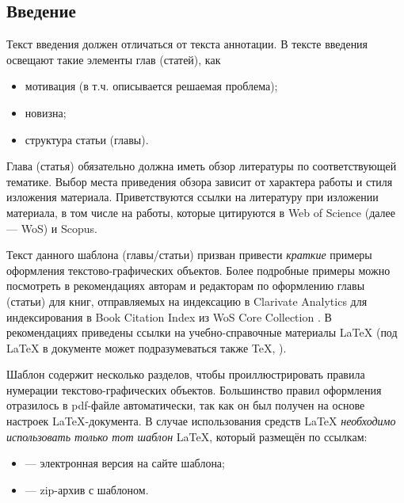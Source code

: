 	\begin{refsection}[my_folder/my_biblio.bib] %
		
	\newrefcontext[labelprefix=\thechapter.] %

	
	
	\section*{Введение} \label{ch-11:intro}

Текст введения должен отличаться от текста аннотации. В тексте введения освещают такие элементы глав (статей), как

\begin{itemize}
	\item мотивация (в т.ч. описывается решаемая проблема);
	\item новизна;
	\item структура статьи (главы).
\end{itemize}

Глава (статья) обязательно должна иметь обзор литературы по соответствующей тематике. Выбор места приведения обзора зависит от характера работы и стиля изложения материала. Приветствуются ссылки на литературу при изложении материала, в том числе на работы, которые цитируются в Web of Science (далее --- WoS) и Scopus.

Текст данного шаблона (главы/статьи) призван привести \textit{краткие} примеры оформления текстово-графических объектов. Более подробные примеры можно посмотреть в рекомендациях авторам и редакторам по оформлению главы (статьи) для книг, отправляемых на индексацию в Clarivate Analytics для индексирования в Book Citation Index из WoS Core Collection \cite{spbpu-bci-template-author-guide}. В рекомендациях приведены ссылки на учебно-справочные материалы \LaTeX{} (под \LaTeX{} в документе может подразумеваться также \TeX, \LaTeXe).

Шаблон содержит несколько разделов, чтобы проиллюстрировать правила нумерации текстово-графических объектов. Большинство правил оформления отразилось в pdf-файле автоматически, так как он был получен на основе настроек \LaTeX-документа. В случае использования средств \LaTeX{} \emph{необходимо использовать только тот шаблон} \LaTeX, который размещён по ссылкам: 
\begin{itemize}
	\item \cite{spbpu-bci-template} --- электронная версия на сайте шаблона;
	\item \cite{spbpu-bci-template-zip} --- zip-архив с шаблоном.
\end{itemize}


\end{refsection}
